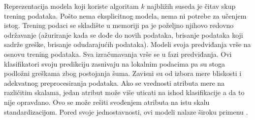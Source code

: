 \documentclass[12pt,oneside]{memoir}
\begin{document}
Reprezentacija modela koji koriste algoritam $k$ najbližih suseda je čitav skup trening podataka. Pošto nema eksplicitnog modela, nema ni potrebe za učenjem istog. Trening podaci se skladište u memoriji pa je poželjno njihovo redovno održavanje (ažuriranje kada se dođe do novih podataka, brisanje podataka koji sadrže greške, brisanje odudarajućih podataka). Modeli svoja predviđanja vrše na osnovu trening podataka. Sva izračunavanja vrše se u fazi predviđanja. Ovi klasifikatori svoju predikciju zasnivaju na lokalnim podacima pa su stoga podložni greškama zbog postojanja šuma. Zavisni su od izbora mere bliskosti i adekvatnog preprocesiranja podataka. Ako se vrednosti atributa mere na različitim skalama, jedan atribut može više uticati na ishod klasifikacije a da to nije opravdano. Ovo se može rešiti svođenjem atributa na istu skalu standardizacijom. Pored svoje jednostavnosti, ovi modeli nalaze široku primenu \cite{mlm, mladen, mitic}.









\end{document}
